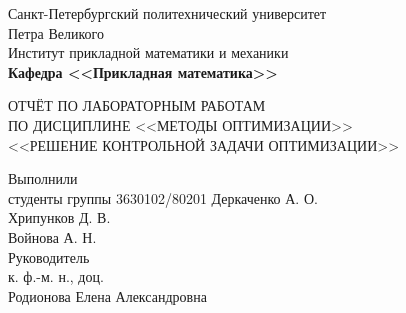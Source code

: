 \documentclass[main.tex]{subfiles}
\begin{document}
\begin{titlepage}
\begin{center}
	\begin{large}
		Санкт-Петербургский политехнический университет\\ Петра Великого\\		
		\vspace{\baselineskip}
		Институт прикладной математики и механики\\
		\textbf{Кафедра <<Прикладная математика>>}\\
	\end{large}
	\vfill
	\Large{{ОТЧЁТ ПО ЛАБОРАТОРНЫМ РАБОТАМ\\
	ПО ДИСЦИПЛИНЕ <<МЕТОДЫ ОПТИМИЗАЦИИ>>\\ <<РЕШЕНИЕ КОНТРОЛЬНОЙ ЗАДАЧИ ОПТИМИЗАЦИИ>>}}
\end{center}
\vfill
\flushleft
Выполнили\\
студенты группы 3630102/80201
\flushright
Деркаченко А. О.\\
Хрипунков Д. В.\\
Войнова А. Н.\\ 
\flushleft
Руководитель\\
к. ф.-м. н., доц.\\
\flushright
Родионова Елена Александровна
\vfill
{}
\end{titlepage}
\end{document}
